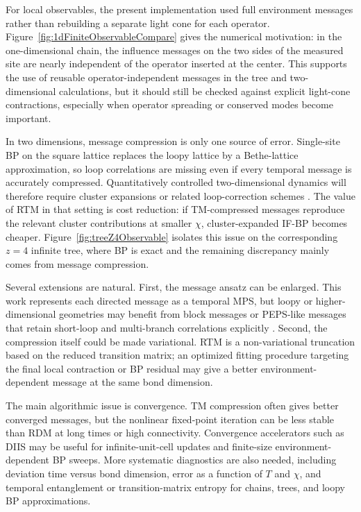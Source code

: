 \documentclass[12pt]{article}
\begin{document}
For local observables, the present implementation used full environment messages rather than rebuilding a separate light cone for each operator.
Figure~\ref{fig:1dFiniteObservableCompare} gives the numerical motivation: in the one-dimensional chain, the influence messages on the two sides of the measured site are nearly independent of the operator inserted at the center.
This supports the use of reusable operator-independent messages in the tree and two-dimensional calculations, but it should still be checked against explicit light-cone contractions, especially when operator spreading or conserved modes become important.

In two dimensions, message compression is only one source of error.
Single-site BP on the square lattice replaces the loopy lattice by a Bethe-lattice approximation, so loop correlations are missing even if every temporal message is accurately compressed.
Quantitatively controlled two-dimensional dynamics will therefore require cluster expansions or related loop-correction schemes \cite{parkSimulatingQuantumDynamics2025}.
The value of RTM in that setting is cost reduction: if TM-compressed messages reproduce the relevant cluster contributions at smaller \(\chi\), cluster-expanded IF-BP becomes cheaper.
Figure~\ref{fig:treeZ4Observable} isolates this issue on the corresponding \(z=4\) infinite tree, where BP is exact and the remaining discrepancy mainly comes from message compression.

Several extensions are natural.
First, the message ansatz can be enlarged.
This work represents each directed message as a temporal MPS, but loopy or higher-dimensional geometries may benefit from block messages or PEPS-like messages that retain short-loop and multi-branch correlations explicitly \cite{guoBlockBeliefPropagation2023,wangTensorNetworkMessage2023}.
Second, the compression itself could be made variational.
RTM is a non-variational truncation based on the reduced transition matrix; an optimized fitting procedure targeting the final local contraction or BP residual may give a better environment-dependent message at the same bond dimension.

The main algorithmic issue is convergence.
TM compression often gives better converged messages, but the nonlinear fixed-point iteration can be less stable than RDM at long times or high connectivity.
Convergence accelerators such as DIIS \cite{pulayConvergenceAccelerationIterative1980,pulayImprovedSCFConvergence1982} may be useful for infinite-unit-cell updates and finite-size environment-dependent BP sweeps.
More systematic diagnostics are also needed, including deviation time versus bond dimension, error as a function of \(T\) and \(\chi\), and temporal entanglement or transition-matrix entropy for chains, trees, and loopy BP approximations.
\end{document}
